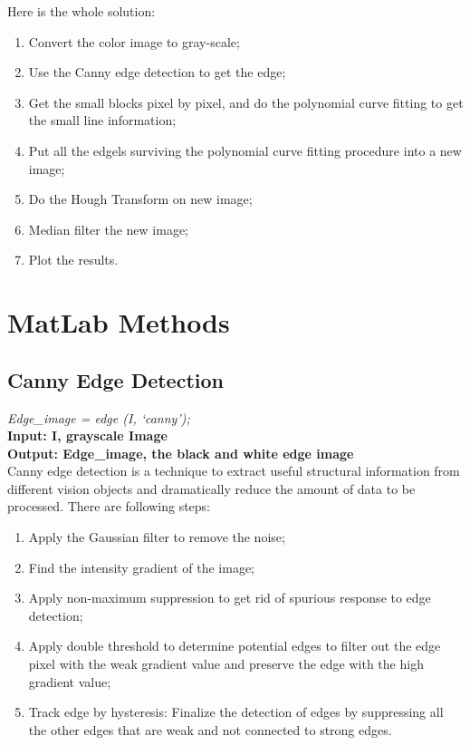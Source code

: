 Here is the whole solution:

\begin{enumerate}
    \item Convert the color image to gray-scale;
    \item Use the Canny edge detection to get the edge;
    \item Get the small blocks pixel by pixel, and do the polynomial curve fitting to get the small line information;
    \item Put all the edgels surviving the polynomial curve fitting procedure into a new image;
    \item Do the Hough Transform on new image;
    \item Median filter the new image;
    \item Plot the results.
\end{enumerate}

\section{MatLab Methods}


\subsection{Canny Edge Detection}
\vspace{3mm}
\textit{Edge\_image = edge (I, \lq{canny}\rq);}\\
\newline
\textbf{Input: I, grayscale Image}\\
\textbf{Output: Edge\_image, the black and white edge image}\\
\newline
Canny edge detection is a technique to extract useful structural information from different vision objects and dramatically reduce the amount of data to be processed. There are following steps:
\begin{enumerate}
\item Apply the Gaussian filter to remove the noise;
\item Find the intensity gradient of the image;
\item Apply non-maximum suppression to get rid of spurious response to edge detection;
\item Apply double threshold to determine potential edges to filter out the edge pixel with the weak gradient value and preserve the edge with the high gradient value;
\item Track edge by hysteresis: Finalize the detection of edges by suppressing all the other edges that are weak and not connected to strong edges.
\end{enumerate}


